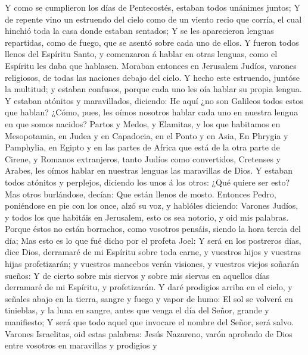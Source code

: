 Y como se cumplieron los días de Pentecostés, estaban todos
unánimes juntos;  Y de repente vino un estruendo del cielo
como de un viento recio que corría, el cual hinchió toda la casa donde
estaban sentados;  Y se les aparecieron lenguas repartidas,
como de fuego, que se asentó sobre cada uno de ellos.  Y
fueron todos llenos del Espíritu Santo, y comenzaron á hablar en otras
lenguas, como el Espíritu les daba que hablasen.  Moraban
entonces en Jerusalem Judíos, varones religiosos, de todas las naciones
debajo del cielo.  Y hecho este estruendo, juntóse la
multitud; y estaban confusos, porque cada uno les oía hablar su propia
lengua.  Y estaban atónitos y maravillados, diciendo: He
aquí ¿no son Galileos todos estos que hablan?  ¿Cómo, pues,
les oímos nosotros hablar cada uno en nuestra lengua en que somos
nacidos?  Partos y Medos, y Elamitas, y los que habitamos en
Mesopotamia, en Judea y en Capadocia, en el Ponto y en Asia,
 En Phrygia y Pamphylia, en Egipto y en las partes de
Africa que está de la otra parte de Cirene, y Romanos extranjeros, tanto
Judíos como convertidos,  Cretenses y Arabes, les oímos
hablar en nuestras lenguas las maravillas de Dios.  Y
estaban todos atónitos y perplejos, diciendo los unos á los otros: ¿Qué
quiere ser esto?  Mas otros burlándose, decían: Que están
llenos de mosto.  Entonces Pedro, poniéndose en pie con los
once, alzó su voz, y hablóles diciendo: Varones Judíos, y todos los que
habitáis en Jerusalem, esto os sea notorio, y oid mis palabras.
 Porque éstos no están borrachos, como vosotros pensáis,
siendo la hora tercia del día;  Mas esto es lo que fué
dicho por el profeta Joel:  Y será en los postreros días,
dice Dios, derramaré de mi Espíritu sobre toda carne, y vuestros hijos y
vuestras hijas profetizarán; y vuestros mancebos verán visiones, y
vuestros viejos soñarán sueños:  Y de cierto sobre mis
siervos y sobre mis siervas en aquellos días derramaré de mi Espíritu, y
profetizarán.  Y daré prodigios arriba en el cielo, y
señales abajo en la tierra, sangre y fuego y vapor de humo:
 El sol se volverá en tinieblas, y la luna en sangre, antes
que venga el día del Señor, grande y manifiesto;  Y será
que todo aquel que invocare el nombre del Señor, será salvo.
 Varones Israelitas, oid estas palabras: Jesús Nazareno,
varón aprobado de Dios entre vosotros en maravillas y prodigios y
